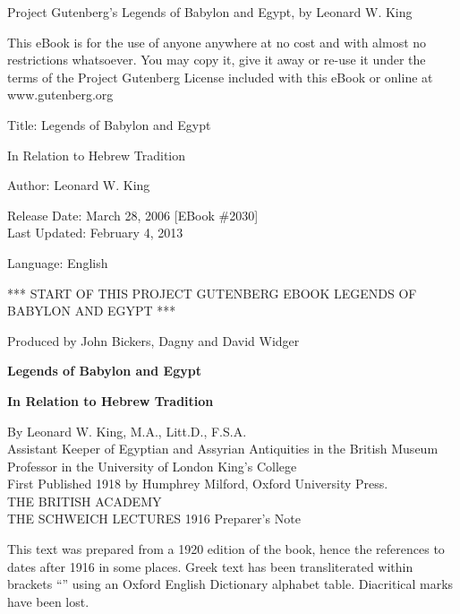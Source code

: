 \documentclass[12pt,oneside]{book}
\begin{document}
    
\frontmatter

Project Gutenberg's Legends of Babylon and Egypt, by Leonard W. King \par 

This eBook is for the use of anyone anywhere at no cost and with almost no restrictions whatsoever. You may copy it, give it away or re-use it under the terms of the Project Gutenberg License included with this eBook or online at www.gutenberg.org \par 

Title: Legends of Babylon and Egypt \par 
\hspace{1cm}In Relation to Hebrew Tradition \par 

Author: Leonard W. King \par 

Release Date: March 28, 2006 [EBook \#2030] \\
Last Updated: February 4, 2013 \par 

Language: English \par 

*** START OF THIS PROJECT GUTENBERG EBOOK LEGENDS OF BABYLON AND EGYPT ***

\vfill 

Produced by John Bickers, Dagny and David Widger \par 

\begin{titlepage}
    \centering 
    \vspace*{2cm}
    {\Huge \textbf{Legends of Babylon and Egypt}} \par 
    \vspace{3cm}
    {\Large \textbf{In Relation to Hebrew Tradition}}
\end{titlepage}

\begin{center}
    {\Large By Leonard W. King, M.A., Litt.D., F.S.A.} \\
    \vspace{1cm}
    {\large Assistant Keeper of Egyptian and Assyrian Antiquities in the British Museum} \\
    \vspace{1cm}
    {\large Professor in the University of London King's College} \\
    \vspace{1cm}
    {\large First Published 1918 by Humphrey Milford, Oxford University Press.} \\
    \vspace{1cm}
    {\large \uppercase{The British Academy \\ The Schweich Lectures 1916}}
    \vfill 
    Preparer's Note \\
\end{center}
This text was prepared from a 1920 edition of the book, hence the references to dates after 1916 in some places. Greek text has been transliterated within brackets ``{}'' using an Oxford English Dictionary alphabet table. Diacritical marks have been lost. \par 
\end{document}
